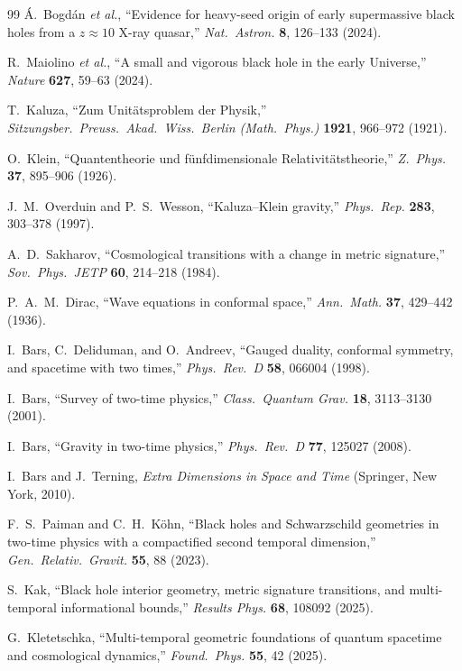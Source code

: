 \documentclass[11pt,a4paper]{article}
\theoremstyle{plain}
\theoremstyle{definition}
\theoremstyle{remark}
\numberwithin{equation}{section}
\begin{document}
\begin{thebibliography}{99}
\'A.~Bogd\'an \textit{et al.}, ``Evidence for heavy-seed origin of early supermassive black holes from a $z \approx 10$ X-ray quasar,'' \textit{Nat.\ Astron.} \textbf{8}, 126--133 (2024).

R.~Maiolino \textit{et al.}, ``A small and vigorous black hole in the early Universe,'' \textit{Nature} \textbf{627}, 59--63 (2024).

T.~Kaluza, ``Zum Unit\"atsproblem der Physik,'' \textit{Sitzungsber.\ Preuss.\ Akad.\ Wiss.\ Berlin (Math.\ Phys.)} \textbf{1921}, 966--972 (1921).

O.~Klein, ``Quantentheorie und f\"unfdimensionale Relativit\"atstheorie,'' \textit{Z.\ Phys.} \textbf{37}, 895--906 (1926).

J.~M.~Overduin and P.~S.~Wesson, ``Kaluza--Klein gravity,'' \textit{Phys.\ Rep.} \textbf{283}, 303--378 (1997).

A.~D.~Sakharov, ``Cosmological transitions with a change in metric signature,'' \textit{Sov.\ Phys.\ JETP} \textbf{60}, 214--218 (1984).

P.~A.~M.~Dirac, ``Wave equations in conformal space,'' \textit{Ann.\ Math.} \textbf{37}, 429--442 (1936).

I.~Bars, C.~Deliduman, and O.~Andreev, ``Gauged duality, conformal symmetry, and spacetime with two times,'' \textit{Phys.\ Rev.\ D} \textbf{58}, 066004 (1998).

I.~Bars, ``Survey of two-time physics,'' \textit{Class.\ Quantum Grav.} \textbf{18}, 3113--3130 (2001).

I.~Bars, ``Gravity in two-time physics,'' \textit{Phys.\ Rev.\ D} \textbf{77}, 125027 (2008).

I.~Bars and J.~Terning, \textit{Extra Dimensions in Space and Time} (Springer, New York, 2010).

F.~S.~Paiman and C.~H.~K\"ohn, ``Black holes and Schwarzschild geometries in two-time physics with a compactified second temporal dimension,'' \textit{Gen.\ Relativ.\ Gravit.} \textbf{55}, 88 (2023).

S.~Kak, ``Black hole interior geometry, metric signature transitions, and multi-temporal informational bounds,'' \textit{Results Phys.} \textbf{68}, 108092 (2025).

G.~Kletetschka, ``Multi-temporal geometric foundations of quantum spacetime and cosmological dynamics,'' \textit{Found.\ Phys.} \textbf{55}, 42 (2025).


\end{thebibliography}
\end{document}
